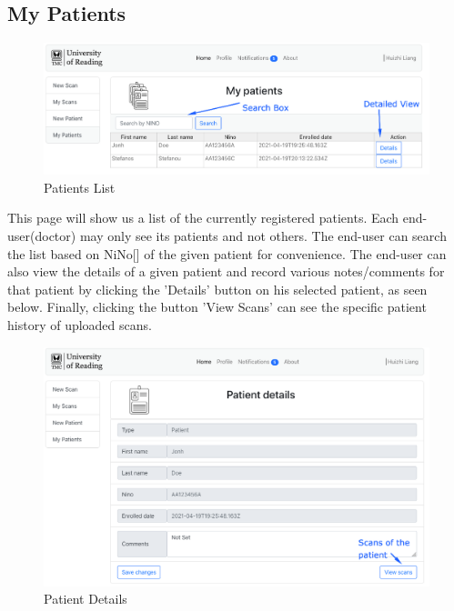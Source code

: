 		\subsection{My Patients}
			\label{my-patients}
			\begin{figure}[H]
				\iftrue
				\centering
				\caption{Patients List}
				\includegraphics[scale=0.3]{figures/mypatients}
				\fi
			\end{figure}
			This page will show us a list of the currently registered patients. Each end-user(doctor) may only see its 
			patients and not others. The end-user can search the list based on NiNo[\cite{nino-format}] of the given 
			patient for convenience. The end-user can also view the details of a given patient and record various 
			notes/comments for that patient by clicking the 'Details' button on his selected patient, as seen below. 
			Finally, clicking the button 'View Scans' can see the specific patient history of uploaded scans.
			\begin{figure}[H]
				\iftrue
				\centering
				\caption{Patient Details}
				\includegraphics[scale=0.3]{figures/mypatients2}
				\fi
			\end{figure}
